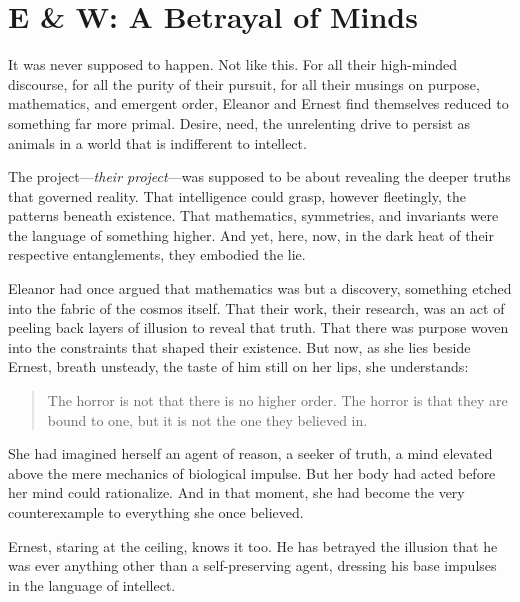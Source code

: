 \chapter{E \& W: A Betrayal of Minds}

It was never supposed to happen. Not like this. For all their high-minded discourse, for all the purity of their pursuit, for all their musings on purpose, mathematics, and emergent order, Eleanor and Ernest find themselves reduced to something far more primal. Desire, need, the unrelenting drive to persist as animals in a world that is indifferent to intellect.

The project—\textit{their project}—was supposed to be about revealing the deeper truths that governed reality. That intelligence could grasp, however fleetingly, the patterns beneath existence. That mathematics, symmetries, and invariants were the language of something higher. And yet, here, now, in the dark heat of their respective entanglements, they embodied the lie.

\smallskip

Eleanor had once argued that mathematics was  but a discovery, something etched into the fabric of the cosmos itself. That their work, their research, was an act of peeling back layers of illusion to reveal that truth. That there was purpose woven into the constraints that shaped their existence. But now, as she lies beside Ernest, breath unsteady, the taste of him still on her lips, she understands:  

\begin{quote}
The horror is not that there is no higher order. The horror is that they are bound to one, but it is not the one they believed in.  
\end{quote}

She had imagined herself an agent of reason, a seeker of truth, a mind elevated above the mere mechanics of biological impulse. But her body had acted before her mind could rationalize. And in that moment, she had become the very counterexample to everything she once believed.

\smallskip

Ernest, staring at the ceiling, knows it too. He has betrayed the illusion that he was ever anything other than a self-preserving agent, dressing his base impulses in the language of intellect. 


